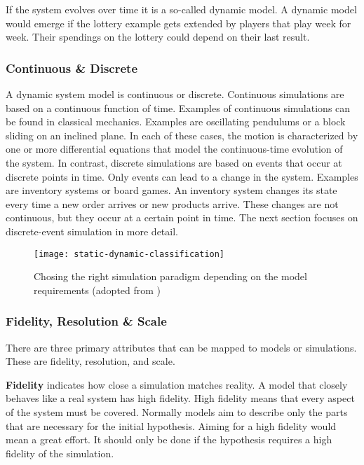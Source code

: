 If the system evolves over time it is a so-called dynamic model. A dynamic model would emerge if the lottery example gets extended by players that play week for week. Their spendings on the lottery could depend on their last result.


\subsubsection{Continuous \& Discrete}

A dynamic system model is continuous or discrete. Continuous simulations are based on a continuous function of time. Examples of continuous simulations can be found in classical mechanics. Examples are oscillating pendulums or a block sliding on an inclined plane. In each of these cases, the motion is characterized by one or more differential equations that model the continuous-time evolution of the system.
In contrast, discrete simulations are based on events that occur at discrete points in time. Only events can lead to a change in the system. Examples are inventory systems or board games.
An inventory system changes its state every time a new order arrives or new products arrive. These changes are not continuous, but they occur at a certain point in time.
The next section focuses on discrete-event simulation in more detail.

\begin{figure}[h!]
 \caption{Chosing the right simulation paradigm depending on the model requirements (adopted from \cite[page 3]{leemis2006discrete})}
 \texttt{[image: static-dynamic-classification]}
\end{figure}


\subsubsection{Fidelity, Resolution \& Scale}

There are three primary attributes that can be mapped to models or simulations.
These are fidelity, resolution, and scale. \cite{sokolowski2010modelingintro}

\textbf{Fidelity} indicates how close a simulation matches reality. A model that closely behaves like a real system has high fidelity. High fidelity means that every aspect of the system must be covered. Normally models aim to describe only the parts that are necessary for the initial hypothesis. Aiming for a high fidelity would mean a great effort. It should only be done if the hypothesis requires a high fidelity of the simulation.


